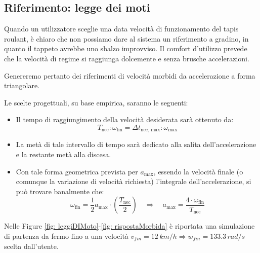 \documentclass[a4paper,12pt]{article}
\begin{document}
\subsection{Riferimento: legge dei moti}

Quando un utilizzatore sceglie una data velocità di funzionamento del tapis roulant, è chiaro che non possiamo dare al sistema un riferimento a gradino, in quanto il tappeto avrebbe uno sbalzo improvviso. Il comfort d'utilizzo prevede che la velocità di regime si raggiunga dolcemente e senza brusche accelerazioni.

\vspace{0.3cm}

Genereremo pertanto dei riferimenti di velocità morbidi da accelerazione a forma triangolare.

Le scelte progettuali, su base empirica, saranno le seguenti:

\begin{itemize}
    \item Il tempo di raggiungimento della velocità desiderata sarà ottenuto da: 
    \[
    T_{\text{nec}} : \omega_{\text{fin}} = \Delta t_{\text{nec, max}} : \omega_{\text{max}}
    \]
    
    \item La metà di tale intervallo di tempo sarà dedicato alla salita dell'accelerazione e la restante metà alla discesa.
    
    \item Con tale forma geometrica prevista per $a_{\text{max}}$, essendo la velocità finale (o comunque la variazione di velocità richiesta) l'integrale dell'accelerazione, si può trovare banalmente che:
    \[
    \omega_{\text{fin}} = \frac{1}{2} a_{\text{max}} \cdot \left( \frac{T_{\text{nec}}}{2} \right)
    \quad \Rightarrow \quad 
    a_{\text{max}} = \frac{4 \cdot \omega_{\text{fin}}}{T_{\text{nec}}}
    \]
\end{itemize}

Nelle Figure \ref{fig: leggiDIMoto}-\ref{fig: rispostaMorbida} è riportata una simulazione di  partenza da fermo fino a una velocità $v_{fin}=12\,km/h\Rightarrow w_{fin}=133.3\,rad/s$ scelta dall’utente.

\vspace{0.5cm}
\end{document}
